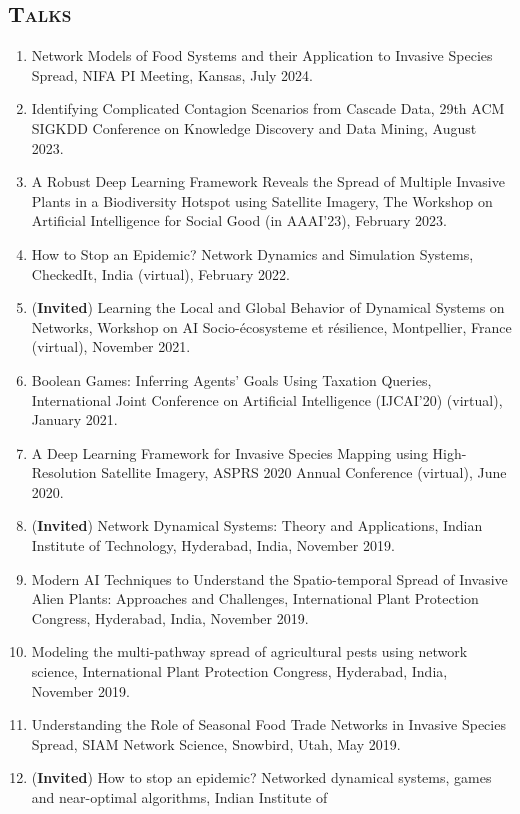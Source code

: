 \documentclass[margin,10pt]{res} %
\begin{document}
\begin{resume}
{\section{\textnormal{\textsc{Talks}}} 
\begin{enumerate}[1.] \item Network Models of Food Systems and their
Application to Invasive Species Spread, NIFA PI Meeting, Kansas, July 2024.
\item Identifying Complicated Contagion Scenarios from Cascade Data, 29th
ACM SIGKDD Conference on Knowledge Discovery and Data Mining, August
2023.
\item A Robust Deep Learning Framework Reveals the Spread of Multiple
Invasive Plants in a Biodiversity Hotspot using Satellite Imagery, The
Workshop on Artificial Intelligence for Social Good (in AAAI'23), February
2023.
\item How to Stop an Epidemic? Network Dynamics and Simulation Systems,
CheckedIt, India (virtual), February 2022.
\item (\textbf{Invited}) Learning the Local and Global Behavior of
Dynamical Systems on Networks, Workshop on AI Socio-\'{e}cosysteme et
r\'{e}silience, Montpellier, France (virtual), November 2021.
\item Boolean Games: Inferring Agents' Goals Using Taxation Queries,
International Joint Conference on Artificial Intelligence (IJCAI'20)
(virtual), January 2021.
\item A Deep Learning Framework for Invasive Species Mapping using
High-Resolution Satellite Imagery, ASPRS 2020 Annual Conference (virtual), June 2020.
\item (\textbf{Invited}) Network Dynamical Systems: Theory and
Applications, Indian Institute of Technology, Hyderabad, India,
November 2019.
\item Modern AI Techniques to Understand the Spatio-temporal Spread of
Invasive Alien Plants: Approaches and Challenges, International Plant
Protection Congress, Hyderabad, India, November 2019.
\item Modeling the multi-pathway spread of agricultural pests using
network science, International Plant Protection Congress, Hyderabad,
India, November 2019.
\item Understanding the Role of Seasonal Food Trade Networks in Invasive
Species Spread, SIAM Network Science, Snowbird, Utah,
May 2019.
\item (\textbf{Invited}) How to stop an epidemic? Networked dynamical
systems, games and near-optimal algorithms, Indian Institute of

\end{enumerate}}
\end{resume}
\end{document}
